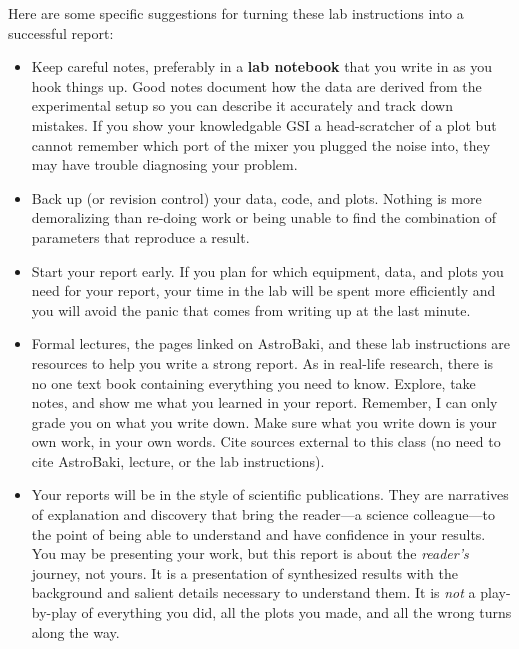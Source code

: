 \documentclass[12pt,preprint]{aastex}
\begin{document}
Here are some specific suggestions for turning these lab instructions into a successful report:
\begin{itemize}

\item Keep careful notes, preferably in a {\bf lab notebook} that you write in as you hook things up.
Good notes document how the data are derived from the experimental setup so you can describe it accurately and track down mistakes.
If you show your knowledgable GSI a head-scratcher of a plot but cannot remember
which port of the mixer you plugged the noise into, they may have trouble diagnosing your problem.

\item Back up (or revision control) your data, code, and plots. Nothing is more demoralizing than re-doing work
or being unable to find the combination of parameters that reproduce a result.

\item Start your report early. If you plan for which equipment, data, and plots you need
for your report, your time in the lab will be spent more efficiently and you will avoid the 
panic that comes from writing up at the last minute.

\item Formal lectures, the pages linked on AstroBaki, and these lab instructions are 
resources to help you write a strong report. As in real-life research, there
is no one text book containing everything you need to know. Explore, take notes, and show
me what you learned in your report. Remember, I can only grade you on what you write down.
Make sure what you write down is your own work, in your own words. Cite sources
external to this class (no need to cite AstroBaki, lecture, or the lab instructions).

\item Your reports will be in the style of scientific publications. They are narratives of explanation and discovery 
that bring the reader---a science colleague---to the point of being able to understand and have confidence in your results.
You may be presenting your work, but this report is about the {\it reader's} journey, not yours.
It is a presentation of synthesized results with the background and salient details necessary to understand them. 
It is {\it not} a play-by-play of everything you did, all the plots you made, and all the wrong turns along the way.

\end{itemize}
\end{document}
